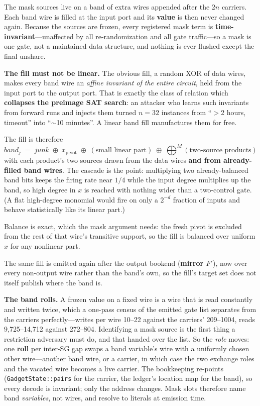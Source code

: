 \documentclass[11pt]{article}
\newcommand{\xor}{\oplus}
\begin{document}
The mask sources live on a band of extra wires appended after the $2n$ carriers.
Each band wire is filled at the input port and its \textbf{value} is then never
changed again. Because the sources are frozen, every registered mask term is
\textbf{time-invariant}---unaffected by all re-randomization and all gate
traffic---so a mask is one gate, not a maintained data structure, and nothing is
ever flushed except the final unshare.

\textbf{The fill must not be linear.} The obvious fill, a random XOR of data
wires, makes every band wire an \emph{affine invariant of the entire circuit},
held from the input port to the output port. That is exactly the class of
relation which \textbf{collapses the preimage SAT search}: an attacker who
learns such invariants from forward runs and injects them turned $n{=}32$
instances from ``$>$2 hours, timeout'' into ``$\sim$10 minutes''. A linear band
fill manufactures them for free.

The fill is therefore
\[
\mathit{band}_j \;=\; \mathit{junk}\;\xor\;x_{\mathrm{pivot}}\;\xor\;(\text{small linear part})\;\xor\;\bigoplus\nolimits^{M}(\text{two-source products})
\]
with each product's two sources drawn from the data wires \textbf{and from
already-filled band wires}. The cascade is the point: multiplying two
already-balanced band bits keeps the firing rate near $1/4$ while the input
degree multiplies up the band, so high degree in $x$ is reached with nothing
wider than a two-control gate. (A flat high-degree monomial would fire on only a
$2^{-d}$ fraction of inputs and behave statistically like its linear part.)

Balance is exact, which the mask argument needs: the fresh pivot is excluded
from the rest of that wire's transitive support, so the fill is balanced over
uniform $x$ for any nonlinear part.

The same fill is emitted again after the output bookend (\textbf{mirror $F'$}),
now over every non-output wire rather than the band's own, so the fill's target
set does not itself publish where the band is.

\textbf{The band rolls.} A frozen value on a fixed wire is a wire that is read
constantly and written twice, which a one-pass census of the emitted gate list
separates from the carriers perfectly---writes per wire 10--22 against the
carriers' 209--1004, reads 9{,}725--14{,}712 against 272--804. Identifying a mask
source is the first thing a restriction adversary must do, and that handed over
the list. So the \emph{role} moves: one \textbf{roll} per inter-SG gap swaps a
band variable's wire with a uniformly chosen other wire---another band wire, or a
carrier, in which case the two exchange roles and the vacated wire becomes a live
carrier. The bookkeeping re-points (\texttt{GadgetState::pairs} for the carrier,
the ledger's location map for the band), so every decode is invariant; only the
address changes. Mask slots therefore name band \emph{variables}, not wires, and
resolve to literals at emission time.
\end{document}

